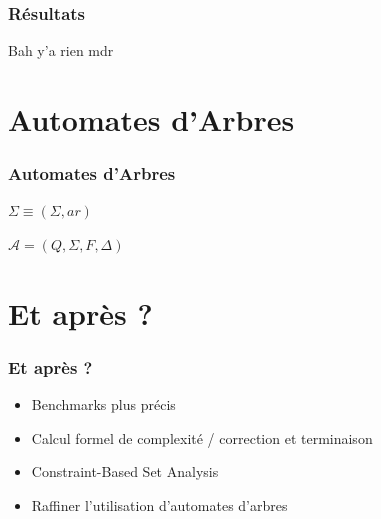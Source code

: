 \documentclass{beamer}
\begin{document}
\begin{frame}
		\frametitle{Résultats}
		Bah y'a rien mdr
\end{frame}

\section{Automates d'Arbres}
\begin{frame}
		\frametitle {Automates d'Arbres}
		\begin{definition}
				$\Sigma \equiv (\Sigma, ar)$
		\end{definition}
		\begin{definition}
				$\mathcal{A} = (Q, \Sigma, F, \Delta)$
		\end{definition}
		\begin{center}
				\begin{tikzpicture}
				\end{tikzpicture}
		\end{center}
\end{frame}

\section{Et après ?}
\begin{frame}
		\frametitle{Et après ?}
		\begin{itemize}
				\item Benchmarks plus précis 
				\item Calcul formel de complexité / correction et terminaison
				\item Constraint-Based Set Analysis
				\item Raffiner l'utilisation d'automates d'arbres
		\end{itemize}
\end{frame}
\end{document}
